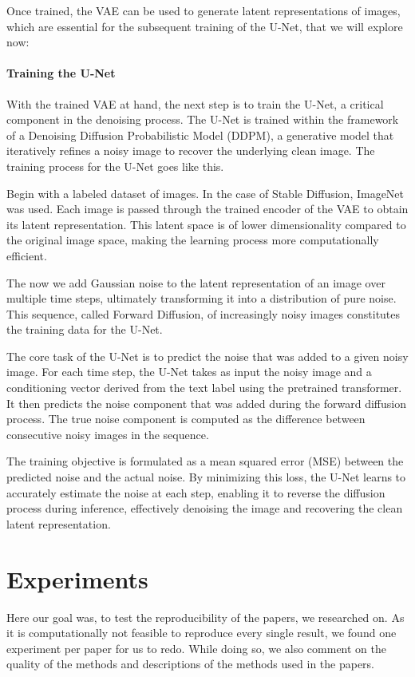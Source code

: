 \documentclass[11pt]{article}
\begin{document}
Once trained, the VAE can be used to generate latent representations of images, which are essential for the subsequent training of the U-Net, that we will explore now:

\paragraph{Training the U-Net}
With the trained VAE at hand, the next step is to train the U-Net, a critical component in the denoising process. The U-Net is trained within the framework of a Denoising Diffusion Probabilistic Model (DDPM)\cite{ho2020denoisingdiffusionprobabilisticmodels}, a generative model that iteratively refines a noisy image to recover the underlying clean image. The training process for the U-Net goes like this.

Begin with a labeled dataset of images. In the case of Stable Diffusion, ImageNet\cite{deng2009imagenet} was used. Each image is passed through the trained encoder of the VAE to obtain its latent representation. This latent space is of lower dimensionality compared to the original image space, making the learning process more computationally efficient.

The now we add Gaussian noise to the latent representation of an image over multiple time steps, ultimately transforming it into a distribution of pure noise. This sequence, called Forward Diffusion, of increasingly noisy images constitutes the training data for the U-Net.

The core task of the U-Net is to predict the noise that was added to a given noisy image. For each time step, the U-Net takes as input the noisy image and a conditioning vector derived from the text label using the pretrained transformer. It then predicts the noise component that was added during the forward diffusion process. The true noise component is computed as the difference between consecutive noisy images in the sequence.

The training objective is formulated as a mean squared error (MSE) between the predicted noise and the actual noise. By minimizing this loss, the U-Net learns to accurately estimate the noise at each step, enabling it to reverse the diffusion process during inference, effectively denoising the image and recovering the clean latent representation.





\newpage
\section{Experiments}
Here our goal was, to test the reproducibility of the papers, we researched on. As it is computationally not feasible to reproduce every single result, we found one experiment per paper for us to redo. While doing so, we also comment on the quality of the methods and descriptions of the methods used in the papers.
\end{document}
